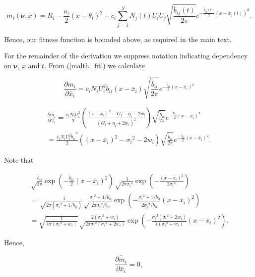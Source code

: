 \documentclass[]{article}
\begin{document}
\begin{equation}\label{malth_fit}
m_i(\pmb\nu,x)=R_i-\frac{a_i}{2}(x-\theta_i)^2-c_i\sum_{j=1}^SN_j(t)U_iU_j\sqrt{\frac{\tilde b_{ij}(t)}{2\pi}}e^{-\frac{\tilde b_{ij}(t)}{2}(x-\bar x_j(t))^2}.
\end{equation}

Hence, our fitness function is bounded above, as required in the main
text.

For the remainder of the derivation we suppress notation indicating
dependency on \(\pmb\nu\), \(x\) and \(t\). From (\ref{malth_fit}) we
calculate

\begin{equation}
\frac{\partial m_i}{\partial\bar x_i}=c_iN_iU_i^2\tilde b_{ii}(x-\bar x_i)\sqrt{\frac{\tilde b_{ii}}{2\pi}}e^{-\frac{\tilde b_{ii}}{2}(x-\bar x_i)^2}
\end{equation}

\begin{multline}
\frac{\partial m_i}{\partial G_i}=\frac{c_iN_iU_i^2}{2}\left(\frac{(x-\bar x_i)^2-G_i-\eta_i-2w_i}{(G_i+\eta_i+2w_i)^2}\right)\sqrt{\frac{\tilde b_{ii}}{2\pi}}e^{-\frac{\tilde b_{ii}}{2}(x-\bar x_i)^2} \\
=\frac{c_iN_iU_i^2{\tilde b_{ii}}^2}{2}\left((x-\bar x_i)^2-{\sigma_i}^2-2w_i\right)\sqrt{\frac{\tilde b_{ii}}{2\pi}}e^{-\frac{\tilde b_{ii}}{2}(x-\bar x_i)^2}.
\end{multline}

Note that

\begin{multline}
\sqrt\frac{\tilde b_{ii}}{2\pi}\exp\left(-\frac{\tilde b_{ii}}{2}(x-\bar x_i)^2\right)\sqrt\frac{1}{2\pi{\sigma_i}^2}\exp\left(-\frac{(x-\bar x_i)^2}{2{\sigma_i}^2}\right) \\
=\sqrt\frac{1}{2\pi({\sigma_i}^2+1/\tilde b_{ii})}\sqrt\frac{{\sigma_i}^2+1/\tilde b_{ii}}{2\pi{\sigma_i}^2/\tilde b_{ii}}\exp\left(-\frac{{\sigma_i}^2+1/\tilde b_{ii}}{2{\sigma_i}^2/\tilde b_{ii}}(x-\bar x_i)^2\right) \\
=\sqrt{\frac{1}{4\pi({\sigma_i}^2+w_i)}}\sqrt\frac{2({\sigma_i}^2+w_i)}{2\pi{\sigma_i}^2({\sigma_i}^2+2w_i)}\exp\left(-\frac{{\sigma_i}^2({\sigma_i}^2+2w_i)}{4({\sigma_i}^2+w_i)}(x-\bar x_i)^2\right).
\end{multline}

Hence,

\begin{equation}
\overline{\frac{\partial m_i}{\partial\bar x_i}}=0,
\end{equation}
\end{document}
